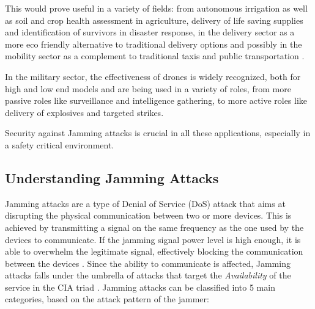 \documentclass[futureinternet,article,submit,pdftex,moreauthors]{Definitions/mdpi}
\begin{document}
This would prove useful in a variety of fields: from autonomous irrigation as well as soil and crop health assessment in agriculture, 
delivery of life saving supplies and identification of survivors in disaster response, in the delivery sector as a more eco friendly alternative to traditional 
delivery options and possibly in the mobility sector as a complement to traditional taxis and public transportation \cite{DroneCommHassija}. 

In the military sector, the effectiveness of drones is widely recognized, both for high and low end models and are being used in a variety of roles, from more passive roles like surveillance and intelligence gathering, to more active roles like
delivery of explosives and targeted strikes. 

Security against Jamming attacks is crucial in all these applications, especially in a safety critical environment. 

\subsection{Understanding Jamming Attacks}

Jamming attacks are a type of Denial of Service (DoS) attack that aims at disrupting the physical communication between two or more devices. 
This is achieved by transmitting a signal on the same frequency as the one used by the devices to communicate. If the jamming signal power level is high enough, 
it is able to overwhelm the legitimate signal, effectively blocking the communication between the devices \cite{DroneCommHassija}. 
Since the ability to communicate is affected, Jamming attacks falls under the umbrella of attacks that target the \textit{Availability} of the service in the CIA triad \cite{DataIntegrityCawthra}. 
Jamming attacks can be classified into 5 main categories, based on the attack pattern of the jammer: 
\end{document}
